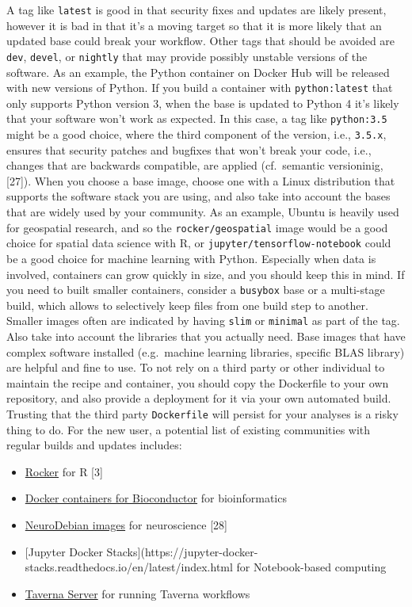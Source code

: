 \documentclass[10pt,letterpaper]{article}
\providecommand{\tightlist}{%
  \setlength{\itemsep}{0pt}\setlength{\parskip}{0pt}}
\begin{document}
A tag like \texttt{latest} is good in that security fixes and updates
are likely present, however it is bad in that it's a moving target so
that it is more likely that an updated base could break your workflow.
Other tags that should be avoided are \texttt{dev}, \texttt{devel}, or
\texttt{nightly} that may provide possibly unstable versions of the
software. As an example, the Python container on Docker Hub will be
released with new versions of Python. If you build a container with
\texttt{python:latest} that only supports Python version 3, when the
base is updated to Python 4 it's likely that your software won't work as
expected. In this case, a tag like \texttt{python:3.5} might be a good
choice, where the third component of the version, i.e., \texttt{3.5.x},
ensures that security patches and bugfixes that won't break your code,
i.e., changes that are backwards compatible, are applied (cf.~semantic
versioninig, {[}27{]}). When you choose a base image, choose one with a
Linux distribution that supports the software stack you are using, and
also take into account the bases that are widely used by your community.
As an example, Ubuntu is heavily used for geospatial research, and so
the \texttt{rocker/geospatial} image would be a good choice for spatial
data science with R, or \texttt{jupyter/tensorflow-notebook} could be a
good choice for machine learning with Python. Especially when data is
involved, containers can grow quickly in size, and you should keep this
in mind. If you need to built smaller containers, consider a
\texttt{busybox} base or a multi-stage build, which allows to
selectively keep files from one build step to another. Smaller images
often are indicated by having \texttt{slim} or \texttt{minimal} as part
of the tag. Also take into account the libraries that you actually need.
Base images that have complex software installed (e.g.~machine learning
libraries, specific BLAS library) are helpful and fine to use. To not
rely on a third party or other individual to maintain the recipe and
container, you should copy the Dockerfile to your own repository, and
also provide a deployment for it via your own automated build. Trusting
that the third party \texttt{Dockerfile} will persist for your analyses
is a risky thing to do. For the new user, a potential list of existing
communities with regular builds and updates includes:

\begin{itemize}
\tightlist
\item
  \href{https://www.rocker-project.org/}{Rocker} for R {[}3{]}
\item
  \href{https://bioconductor.org/help/docker/}{Docker containers for
  Bioconductor} for bioinformatics
\item
  \href{https://hub.docker.com/_/neurodebian}{NeuroDebian images} for
  neuroscience {[}28{]}
\item
  {[}Jupyter Docker
  Stacks{]}(https://jupyter-docker-stacks.readthedocs.io/en/latest/index.html
  for Notebook-based computing
\item
  \href{https://hub.docker.com/r/taverna/taverna-server}{Taverna Server}
  for running Taverna workflows
\end{itemize}
\end{document}
